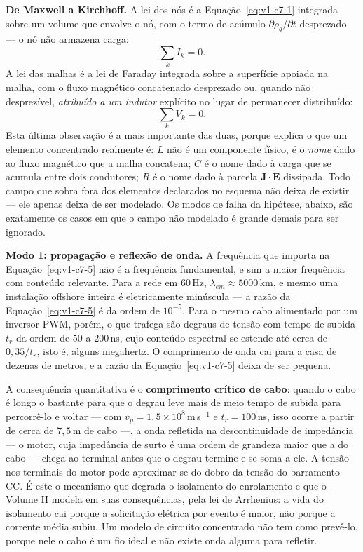 \documentclass[12pt,a4paper]{article}
\numberwithin{equation}{section}
\numberwithin{table}{section}
\numberwithin{figure}{section}
\begin{document}
\textbf{De Maxwell a Kirchhoff.} A lei dos nós é a
Equação~\eqref{eq:v1-c7-1} integrada sobre um volume que envolve o nó, com o
termo de acúmulo $\partial\rho_q/\partial t$ desprezado --- o nó não armazena
carga:
\begin{equation}\label{eq:v1-c7-6}
\sum_k I_k = 0 .
\end{equation}
A lei das malhas é a lei de Faraday integrada sobre a superfície apoiada na
malha, com o fluxo magnético concatenado desprezado ou, quando não desprezível,
\emph{atribuído a um indutor} explícito no lugar de permanecer distribuído:
\begin{equation}\label{eq:v1-c7-7}
\sum_k V_k = 0 .
\end{equation}
Esta última observação é a mais importante das duas, porque explica o que um
elemento concentrado realmente é: $L$ não é um componente físico, é o
\emph{nome} dado ao fluxo magnético que a malha concatena; $C$ é o nome dado à
carga que se acumula entre dois condutores; $R$ é o nome dado à parcela
$\mathbf{J}\cdot\mathbf{E}$ dissipada. Todo campo que sobra fora dos elementos
declarados no esquema não deixa de existir --- ele apenas deixa de ser
modelado. Os modos de falha da hipótese, abaixo, são exatamente os casos em que
o campo não modelado é grande demais para ser ignorado.

\textbf{Modo 1: propagação e reflexão de onda.} A frequência que importa na
Equação~\eqref{eq:v1-c7-5} não é a frequência fundamental, e sim a maior
frequência com conteúdo relevante. Para a rede em $60\,$Hz,
$\lambda_{em}\approx 5000\,$km, e mesmo uma instalação offshore inteira é
eletricamente minúscula --- a razão da Equação~\eqref{eq:v1-c7-5} é da ordem de
$10^{-5}$. Para o mesmo cabo alimentado por um inversor PWM, porém, o que
trafega são degraus de tensão com tempo de subida $t_r$ da ordem de
$50$ a $200\,$ns, cujo conteúdo espectral se estende até cerca de
$0{,}35/t_r$, isto é, alguns megahertz. O comprimento de onda cai para a casa
de dezenas de metros, e a razão da Equação~\eqref{eq:v1-c7-5} deixa de ser
pequena.

A consequência quantitativa é o \textbf{comprimento crítico de cabo}: quando o
cabo é longo o bastante para que o degrau leve mais de meio tempo de subida
para percorrê-lo e voltar --- com $v_p = 1{,}5\times10^{8}\,$m\,s$^{-1}$ e
$t_r = 100\,$ns, isso ocorre a partir de cerca de $7{,}5\,$m de cabo ---, a onda refletida na descontinuidade de impedância
--- o motor, cuja impedância de surto é uma ordem de grandeza maior que a do
cabo --- chega ao terminal antes que o degrau termine e se soma a ele. A
tensão nos terminais do motor pode aproximar-se do dobro da tensão do
barramento CC. É este o mecanismo que degrada o isolamento do enrolamento e que
o Volume II modela em suas consequências, pela lei de Arrhenius: a vida do
isolamento cai porque a solicitação elétrica por evento é maior, não porque a
corrente média subiu. Um modelo de circuito concentrado não tem como prevê-lo,
porque nele o cabo é um fio ideal e não existe onda alguma para refletir.
\end{document}
